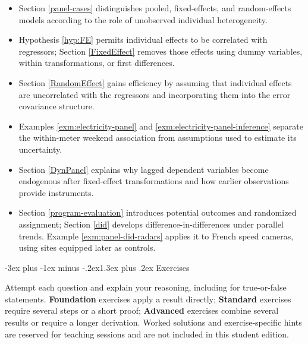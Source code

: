 \documentclass[
  11pt,
]{book}
\makeatletter
\providecommand{\tightlist}{%
  \setlength{\itemsep}{0pt}\setlength{\parskip}{0pt}}
\renewcommand\section{\@startsection{section}{1}{\z@}
  {-3ex plus -1ex minus -.2ex}{1.3ex plus .2ex}
  {\normalfont\Large\bfseries\color{TextbookInk}}}
\theoremstyle{definition}
\theoremstyle{definition}
\theoremstyle{definition}
\theoremstyle{definition}
\theoremstyle{remark}
\makeatother
\begin{document}
\begin{recapbox}

\begin{itemize}
\tightlist
\item
  Section \ref{panel-cases} distinguishes pooled, fixed-effects, and random-effects models according to the role of unobserved individual heterogeneity.
\item
  Hypothesis \ref{hyp:FE} permits individual effects to be correlated with regressors; Section \ref{FixedEffect} removes those effects using dummy variables, within transformations, or first differences.
\item
  Section \ref{RandomEffect} gains efficiency by assuming that individual effects are uncorrelated with the regressors and incorporating them into the error covariance structure.
\item
  Examples \ref{exm:electricity-panel} and \ref{exm:electricity-panel-inference} separate the within-meter weekend association from assumptions used to estimate its uncertainty.
\item
  Section \ref{DynPanel} explains why lagged dependent variables become endogenous after fixed-effect transformations and how earlier observations provide instruments.
\item
  Section \ref{program-evaluation} introduces potential outcomes and randomized assignment; Section \ref{did} develops difference-in-differences under parallel trends. Example \ref{exm:panel-did-radars} applies it to French speed cameras, using sites equipped later as controls.
\end{itemize}

\end{recapbox}

\clearpage

\section{Exercises}\label{panel-exercises}

Attempt each question and explain your reasoning, including for true-or-false statements. \textbf{Foundation} exercises apply a result directly; \textbf{Standard} exercises require several steps or a short proof; \textbf{Advanced} exercises combine several results or require a longer derivation. Worked solutions and exercise-specific hints are reserved for teaching sessions and are not included in this student edition.

\end{document}
